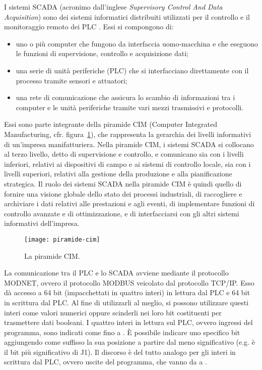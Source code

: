 I sistemi SCADA (acronimo dall'inglese \emph{Supervisory Control And Data Acquisition}) sono dei
sistemi informatici distribuiti utilizzati per il controllo e il monitoraggio remoto dei PLC
\cite{daneels_salter,ferrazza,sielco}. Essi si compongono di:
\begin{itemize}
    \item uno o più computer che fungono da interfaccia uomo-macchina e che eseguono le funzioni di
        supervisione, controllo e acquisizione dati;
    \item una serie di unità periferiche (PLC) che si interfacciano direttamente con il processo
        tramite sensori e attuatori;
    \item una rete di comunicazione che assicura lo scambio di informazioni tra i computer e le
        unità periferiche tramite vari mezzi trasmissivi e protocolli.
\end{itemize}
Essi sono parte integrante della piramide CIM (Computer Integrated Manufacturing, cfr.\@
figura~\ref{fig:piramide-cim}), che rappresenta la gerarchia dei livelli informativi di un'impresa
manifatturiera. Nella piramide CIM, i sistemi SCADA si collocano al terzo livello, detto di
supervisione e controllo, e comunicano sia con i livelli inferiori, relativi ai dispositivi di campo
e ai sistemi di controllo locale, sia con i livelli superiori, relativi alla gestione della
produzione e alla pianificazione strategica. Il ruolo dei sistemi SCADA nella piramide CIM è quindi
quello di fornire una visione globale dello stato dei processi industriali, di raccogliere e
archiviare i dati relativi alle prestazioni e agli eventi, di implementare funzioni di controllo
avanzate e di ottimizzazione, e di interfacciarsi con gli altri sistemi informativi dell'impresa.

\begin{figure}[htbp]\centering
    \caption{La piramide CIM.}\label{fig:piramide-cim}
    \texttt{[image: piramide-cim]}
\end{figure}

La comunicazione tra il PLC e lo SCADA avviene mediante il protocollo MODNET, ovvero il protocollo
MODBUS veicolato dal protocollo TCP/IP. Esso dà accesso a 64 bit (impacchettati in quattro interi)
in lettura dal PLC e 64 bit in scrittura dal PLC. Al fine di utilizzarli al meglio, si possono
utilizzare questi interi come valori numerici oppure scinderli nei loro bit costituenti per
trasmettere dati booleani. I quattro interi in lettura sul PLC, ovvero ingressi del programma, sono
indicati come  fino a . È possibile indicare uno specifico bit aggiungendo
come suffisso la sua posizione a partire dal meno significativo (e.g.\@ {} è il bit
più significativo di J1). Il discorso è del tutto analogo per gli interi in scrittura dal PLC,
ovvero uscite del programma, che vanno da  a .

